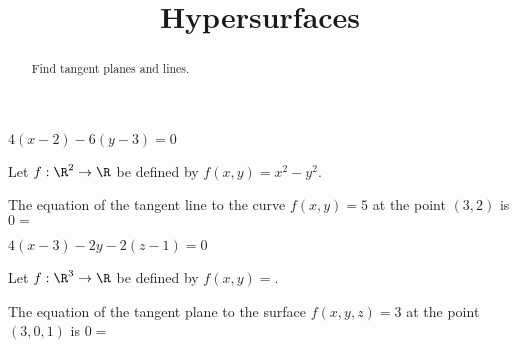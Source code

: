 \documentclass{ximera}
\title{Hypersurfaces}
\begin{document}
	\begin{abstract}
		Find tangent planes and lines.
	\end{abstract}
	
	\begin{question}
		\begin{hint}
			$4(x-2)-6(y-3) = 0$
		\end{hint}
		Let $f:\R^2 \to \R$ be defined by $f(x,y)=x^2-y^2$.
		\begin{question}
			The equation of the tangent line to the curve $f(x,y)=5$ at the point $(3,2)$ 
			is $0=$ 
		\end{question}
	\end{question}
	
	\begin{question}
		\begin{hint}
			$4(x-3)-2y-2(z-1) = 0$
		\end{hint}
		Let $f:\R^3 \to \R$ be defined by $f(x,y)=$.
		\begin{question}
			The equation of the tangent plane to the surface $f(x,y,z)=3$ at the point $(3,0,1)$ 
			is $0=$ \answer{$4(x-3)-2y-2(z-1)$}
		\end{question}
	\end{question}

	
\end{document}
